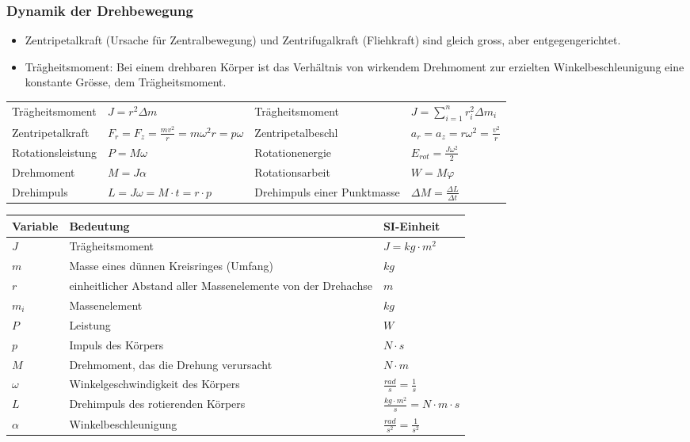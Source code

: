 \documentclass[
a4paper,
oneside,
landscape, 
8pt,
]{scrartcl}
\begin{document}
\begin{multicols*}{2}
\subsubsection{Dynamik der Drehbewegung}
\begin{itemize}
	\item Zentripetalkraft (Ursache für Zentralbewegung) und Zentrifugalkraft (Fliehkraft) sind gleich gross, aber entgegengerichtet.
	\item Trägheitsmoment: Bei einem drehbaren Körper ist das Verhältnis von wirkendem Drehmoment zur erzielten Winkelbeschleunigung eine konstante Grösse, dem Trägheitsmoment.
\end{itemize}
\begin{tabbing}
	\begin{tabu} to \linewidth {X l X l}
		\toprule
		Trägheitsmoment & $J = r^2\Delta m$ &
		Trägheitsmoment & $J = \sum_{i=1}^{n}r_i^2 \Delta m_i$ \\
		Zentripetalkraft & $F_r = F_z = \frac{mv^2}{r} = m\omega^2r = p\omega$ & 
		Zentripetalbeschl & $a_r = a_z = r \omega^2 = \frac{v^2}{r}$ \\
		Rotationsleistung & $P = M \omega$ &
		Rotationenergie & $E_{rot} = \frac{J\omega^2}{2}$\\
		Drehmoment & $M = J\alpha$ &
		Rotationsarbeit & $W = M\varphi$ \\
		Drehimpuls & $L = J \omega = M \cdot t = r\cdot p$ & 
		Drehimpuls einer Punktmasse & $\Delta M = \frac{\Delta L}{\Delta t}$ \\
	\end{tabu}
\end{tabbing}

\begin{tabbing}
	\begin{tabu} to \linewidth {l X l}
		Variable & Bedeutung & SI-Einheit \\
		\midrule
		$J$ & Trägheitsmoment & $J = kg \cdot m^2$ \\ 
		$m$ & Masse eines dünnen Kreisringes (Umfang) & $kg$ \\ 
		$r$ & einheitlicher Abstand aller Massenelemente von der Drehachse & $m$ \\ 
		$m_i$ & Massenelement & $kg$\\ 
		$P$ & Leistung & $W$ \\ 
		$p$ & Impuls des Körpers & $N \cdot s$ \\
		$M$ & Drehmoment, das die Drehung verursacht & $N \cdot m$ \\ 
		$\omega$ & Winkelgeschwindigkeit des Körpers & $\frac{rad}{s} = \frac{1}{s}$ \\ 
		$L$ & Drehimpuls des rotierenden Körpers & $\frac{kg \cdot m^2}{s} = N \cdot m \cdot s$  \\ 
		$\alpha$ & Winkelbeschleunigung & $\frac{rad}{s^2} = \frac{1}{s^2}$ \\
		\bottomrule
	\end{tabu}
\end{tabbing}




\end{multicols*}
\end{document}
